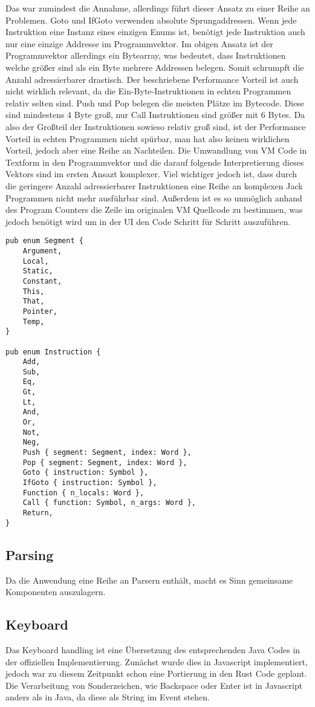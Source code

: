 Das war zumindest die Annahme, allerdings führt dieser Ansatz zu einer Reihe an Problemen. Goto und IfGoto verwenden absolute Sprungaddressen. Wenn jede Instruktion eine Instanz eines einzigen Enums ist, benötigt jede Instruktion auch nur eine einzige Addresse im Programmvektor. Im obigen Ansatz ist der Programmvektor allerdings ein Bytearray, was bedeutet, dass Instruktionen welche größer sind als ein Byte mehrere Addressen belegen. Somit schrumpft die Anzahl adressierbarer drastisch.
Der beschriebene Performance Vorteil ist auch nicht wirklich relevant, da die Ein-Byte-Instruktionen in echten Programmen relativ selten sind. Push und Pop belegen die meisten Plätze im Bytecode. Diese sind mindestens 4 Byte groß, nur Call Instruktionen sind größer mit 6 Bytes.
Da also der Großteil der Instruktionen sowieso relativ groß sind, ist der Performance Vorteil in echten Programmen nicht spürbar, man hat also keinen wirklichen Vorteil, jedoch aber eine Reihe an Nachteilen.
Die Umwandlung von VM Code in Textform in den Programmvektor und die darauf folgende Interpretierung dieses Vektors sind im ersten Ansazt komplexer.
Viel wichtiger jedoch ist, dass durch die geringere Anzahl adressierbarer Instruktionen eine Reihe an komplexen Jack Programmen nicht mehr ausführbar sind.
Außerdem ist es so unmöglich anhand des Program Counters die Zeile im originalen VM Quellcode zu bestimmen, was jedoch benötigt wird um in der UI den Code Schritt für Schritt auszuführen.

\begin{lstlisting}
pub enum Segment {
    Argument,
    Local,
    Static,
    Constant,
    This,
    That,
    Pointer,
    Temp,
}

pub enum Instruction {
    Add,
    Sub,
    Eq,
    Gt,
    Lt,
    And,
    Or,
    Not,
    Neg,
    Push { segment: Segment, index: Word },
    Pop { segment: Segment, index: Word },
    Goto { instruction: Symbol },
    IfGoto { instruction: Symbol },
    Function { n_locals: Word },
    Call { function: Symbol, n_args: Word },
    Return,
}
\end{lstlisting}

\subsection{Parsing}
Da die Anwendung eine Reihe an Parsern enthält, macht es Sinn gemeinsame Komponenten auszulagern.

\subsection{Keyboard}
Das Keyboard handling ist eine Übersetzung des entsprechenden Java Codes in der offiziellen Implementierung.
Zunächst wurde dies in Javascript implementiert, jedoch war zu diesem Zeitpunkt schon eine Portierung in den Rust Code geplant.
Die Verarbeitung von Sonderzeichen, wie Backspace oder Enter ist in Javascript anders als in Java, da diese als String im Event stehen.

